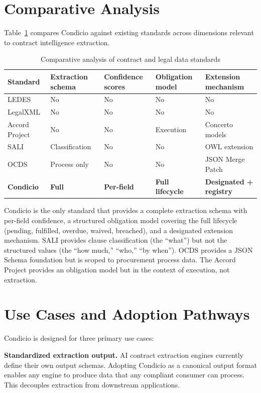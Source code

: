 \documentclass[11pt,a4paper]{article}
\begin{document}
\section{Comparative Analysis}

Table~\ref{tab:comparison} compares Condicio against existing standards across dimensions relevant to contract intelligence extraction.

\begin{table}[h]
\centering
\caption{Comparative analysis of contract and legal data standards}
\label{tab:comparison}
\small
\begin{tabular}{p{2.2cm}p{1.5cm}p{1.5cm}p{1.5cm}p{1.8cm}}
\toprule
\textbf{Standard} & \textbf{Extraction schema} & \textbf{Confidence scores} & \textbf{Obligation model} & \textbf{Extension mechanism} \\
\midrule
LEDES & No & No & No & No \\
LegalXML & No & No & No & No \\
Accord Project & No & No & Execution & Concerto models \\
SALI & Classification & No & No & OWL extension \\
OCDS & Process only & No & No & JSON Merge Patch \\
\textbf{Condicio} & \textbf{Full} & \textbf{Per-field} & \textbf{Full lifecycle} & \textbf{Designated + registry} \\
\bottomrule
\end{tabular}
\end{table}

Condicio is the only standard that provides a complete extraction schema with per-field confidence, a structured obligation model covering the full lifecycle (pending, fulfilled, overdue, waived, breached), and a designated extension mechanism. SALI provides clause classification (the ``what'') but not the structured values (the ``how much,'' ``who,'' ``by when''). OCDS provides a JSON Schema foundation but is scoped to procurement process data. The Accord Project provides an obligation model but in the context of execution, not extraction.

\section{Use Cases and Adoption Pathways}

Condicio is designed for three primary use cases:

\textbf{Standardized extraction output.} AI contract extraction engines currently define their own output schemas. Adopting Condicio as a canonical output format enables any engine to produce data that any compliant consumer can process. This decouples extraction from downstream applications.
\end{document}
